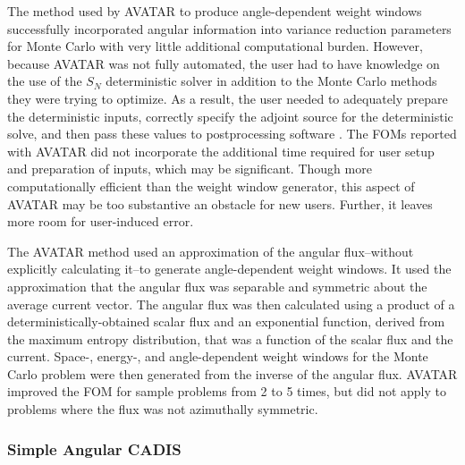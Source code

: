 The method used by AVATAR to produce angle-dependent weight windows successfully
incorporated angular information into variance reduction parameters for Monte Carlo
with very little additional computational burden. However, because AVATAR
was not fully automated, the user had to have knowledge on the use of the $S_N$
deterministic solver in addition to the Monte Carlo methods they were trying to
optimize. As a result, the user needed to adequately prepare the deterministic
inputs, correctly specify the adjoint source for the deterministic solve, and
then pass these values to postprocessing software \cite{peplow_consistent_2012,
evans_enhanced_1998}. 
The FOMs reported with AVATAR did not incorporate the
additional time required for user setup and preparation of inputs, which may be
significant. 
Though more computationally efficient than the weight window generator,
this aspect of AVATAR may be too substantive an obstacle for new users. Further, it leaves more room for user-induced error.
%

The AVATAR method
\cite{van_riper_generation_1995, van_riper_avatarautomatic_1997} used an
approximation of the angular flux--without explicitly calculating it--to
generate angle-dependent weight windows. It used the approximation
that
the angular flux was separable and symmetric about the average current vector.
The angular flux was then calculated using
a product of a deterministically-obtained
scalar flux and an exponential function, derived from the
maximum entropy distribution, that was a function of the scalar flux and the
current. Space-, energy-, and angle-dependent weight windows for
the Monte Carlo problem were then generated from the inverse of the angular
flux. AVATAR improved the FOM for sample problems from 2 to 5 times, but did not
apply to problems where the flux was not azimuthally symmetric.

%

\subsubsection{Simple Angular CADIS}

